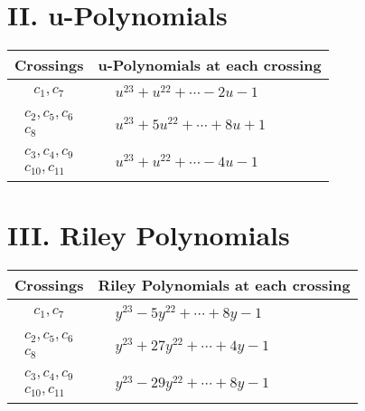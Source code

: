 \documentclass[1p]{elsarticle_modified}
\theoremstyle{definition}
\begin{document}
\newpage\renewcommand{\arraystretch}{1}
\centering \section*{ II. u-Polynomials}
\begin{tabular}{m{50pt}|m{274pt}}
Crossings & \hspace{64pt}u-Polynomials at each crossing \\
\hline $$\begin{aligned}c_{1},c_{7}\end{aligned}$$&$\begin{aligned}
&u^{23}+u^{22}+\cdots-2 u-1
\end{aligned}$\\
\hline $$\begin{aligned}c_{2},c_{5},c_{6}\\c_{8}\end{aligned}$$&$\begin{aligned}
&u^{23}+5 u^{22}+\cdots+8 u+1
\end{aligned}$\\
\hline $$\begin{aligned}c_{3},c_{4},c_{9}\\c_{10},c_{11}\end{aligned}$$&$\begin{aligned}
&u^{23}+u^{22}+\cdots-4 u-1
\end{aligned}$\\
\hline
\end{tabular}\newpage\renewcommand{\arraystretch}{1}
\centering \section*{ III. Riley Polynomials}
\begin{tabular}{m{50pt}|m{274pt}}
Crossings & \hspace{64pt}Riley Polynomials at each crossing \\
\hline $$\begin{aligned}c_{1},c_{7}\end{aligned}$$&$\begin{aligned}
&y^{23}-5 y^{22}+\cdots+8 y-1
\end{aligned}$\\
\hline $$\begin{aligned}c_{2},c_{5},c_{6}\\c_{8}\end{aligned}$$&$\begin{aligned}
&y^{23}+27 y^{22}+\cdots+4 y-1
\end{aligned}$\\
\hline $$\begin{aligned}c_{3},c_{4},c_{9}\\c_{10},c_{11}\end{aligned}$$&$\begin{aligned}
&y^{23}-29 y^{22}+\cdots+8 y-1
\end{aligned}$\\
\hline
\end{tabular}
\vskip 2pc
\end{document}
